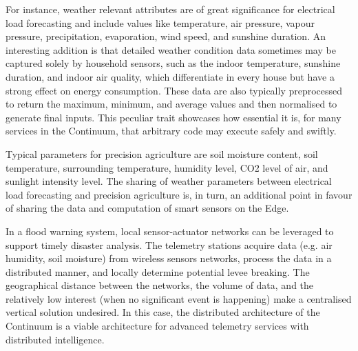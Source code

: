 For instance, weather relevant attributes are of great significance for electrical load forecasting and include values like temperature, air pressure, vapour pressure, precipitation, evaporation, wind speed, and sunshine duration. An interesting addition is that detailed weather condition data sometimes may be captured solely by household sensors, such as the indoor temperature, sunshine duration, and indoor air quality, which differentiate in every house but have a strong effect on energy consumption. These data are also typically preprocessed to return the maximum, minimum, and average values and then normalised to generate final inputs. This peculiar trait showcases how essential it is, for many services in the Continuum, that arbitrary code may execute safely and swiftly.

Typical parameters for precision agriculture are soil moisture content, soil temperature, surrounding temperature, humidity level, CO2 level of air, and sunlight intensity level. The sharing of weather parameters between electrical load forecasting and precision agriculture is, in turn, an additional point in favour of sharing the data and computation of smart sensors on the Edge.

In a flood warning system, local sensor-actuator networks can be leveraged to support timely disaster analysis. The telemetry stations acquire data (e.g. air humidity, soil moisture) from wireless sensors networks, process the data in a distributed manner, and locally determine potential levee breaking. The geographical distance between the networks, the volume of data, and the relatively low interest (when no significant event is happening) make a centralised vertical solution undesired. In this case, the distributed architecture of the Continuum is a viable architecture for advanced telemetry services with distributed intelligence.

